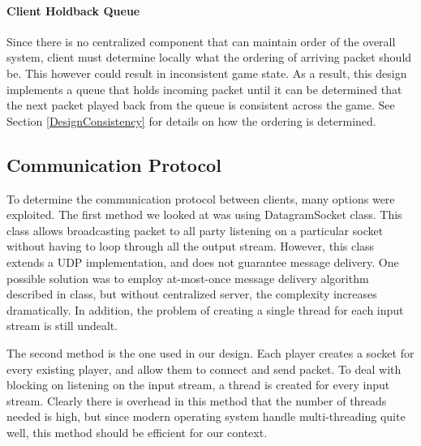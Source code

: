 \paragraph*{Client Holdback Queue}

Since there is no centralized component that can maintain order of the overall system, client must determine locally what the ordering of arriving packet should be. This however could result in inconsistent game state. As a result, this design implements a queue that holds incoming packet until it can be determined that the next packet played back from the queue is consistent across the game. See Section \ref{DesignConsistency} for details on how the ordering is determined.

\subsection{Communication Protocol}\label{DesignProtocol}

To determine the communication protocol between clients, many options were exploited. The first method we looked at was using DatagramSocket class. This class allows broadcasting packet to all party listening on a particular socket without having to loop through all the output stream. However, this class extends a UDP implementation, and does not guarantee message delivery. One possible solution was to employ at-most-once message delivery algorithm described in class, but without centralized server, the complexity increases dramatically. In addition, the problem of creating a single thread for each input stream is still undealt.

The second method is the one used in our design. Each player creates a socket for every existing player, and allow them to connect and send packet. To deal with blocking on listening on the input stream, a thread is created for every input stream. Clearly there is overhead in this method that the number of threads needed is high, but since modern operating system handle multi-threading quite well, this method should be efficient for our context. 

